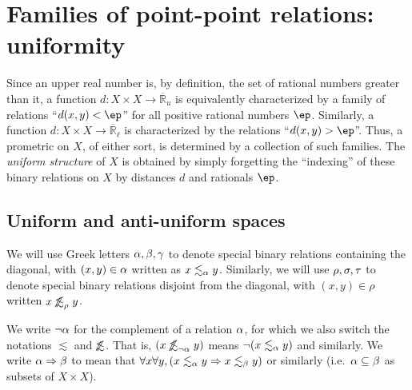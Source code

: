 \documentclass{article}
\def\R{\mathbb{R}}
\def\Re{\overline{\R}}
\def\Reu{\Re_u}
\def\Rel{\Re_{\ell}}
\def\oapt{\mathrel{\!\not\,\not\lesssim}}
\def\leapx{\lesssim}
\def\ent#1{\leapx_{#1}}
\def\aent#1{\oapt_{#1}}
\let\implies\Rightarrow
\begin{document}


\section{Families of point-point relations: uniformity}
\label{sec:uniformity}

Since an upper real number is, by definition, the set of rational numbers greater than it, a function $d:X\times X \to \Reu$ is equivalently characterized by a family of relations ``$d(x,y)<\ep$'' for all positive rational numbers $\ep$.
Similarly, a function $d:X\times X \to \Rel$ is characterized by the relations ``$d(x,y)>\ep$''.
Thus, a prometric on $X$, of either sort, is determined by a collection of such families.
The \emph{uniform structure} of $X$ is obtained by simply forgetting the ``indexing'' of these binary relations on $X$ by distances $d$ and rationals $\ep$.

\subsection{Uniform and anti-uniform spaces}
\label{sec:unif}

We will use Greek letters $\alpha,\beta,\gamma$ to denote special binary relations containing the diagonal, with $(x,y)\in \alpha$ written as $x\ent\al y$.
Similarly, we will use $\rho,\sigma,\tau$ to denote special binary relations disjoint from the diagonal, with $
(x,y)\in\rho$ written $x \aent\rho y$.

We write $\neg\alpha$ for the complement of a relation $\alpha$, for which we also switch the notations $\leapx$ and $\oapt$.
That is, $(x \aent{\neg\al} y)$ means $\neg (x\ent{\al} y)$ and similarly.
We write $\al\implies\be$ to mean that $\forall x\forall y,(x\ent\al y \implies x\ent\be y)$ or similarly (i.e.\ $\alpha\subseteq \beta$ as subsets of $X\times X$).
\end{document}
